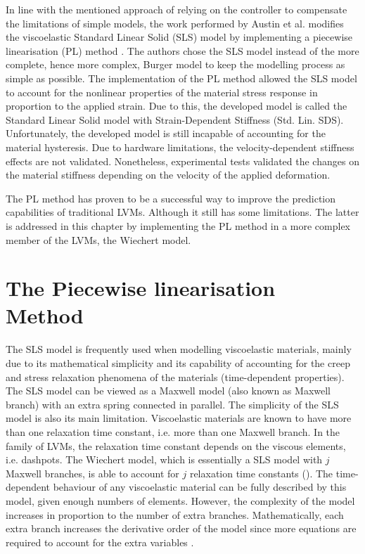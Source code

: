 In line with the mentioned approach of relying on the controller to compensate the limitations of simple models, the work performed by Austin et al. modifies the viscoelastic Standard Linear Solid (SLS) model by implementing a piecewise linearisation (PL) method \cite{austin2015control}. The authors chose the SLS model instead of the more complete, hence more complex, Burger model to keep the modelling process as simple as possible. The implementation of the PL method allowed the SLS model to account for the nonlinear properties of the material stress response in proportion to the applied strain. Due to this, the developed model is called the Standard Linear Solid model with Strain-Dependent Stiffness (Std. Lin. SDS). Unfortunately, the developed model is still incapable of accounting for the material hysteresis. Due to hardware limitations, the velocity-dependent stiffness effects are not validated. Nonetheless, experimental tests validated the changes on the material stiffness depending on the velocity of the applied deformation.

The PL method has proven to be a successful way to improve the prediction capabilities of traditional LVMs. Although it still has some limitations. The latter is addressed in this chapter by implementing the PL method in a more complex member of the LVMs, the Wiechert model.

\section{The Piecewise linearisation Method} \label{sec:wiechert}

The SLS model is frequently used when modelling viscoelastic materials, mainly due to its mathematical simplicity and its capability of accounting for the creep and stress relaxation phenomena of the materials (time-dependent properties). The SLS model can be viewed as a Maxwell model (also known as Maxwell branch) with an extra spring connected in parallel. The simplicity of the SLS model is also its main limitation. 
Viscoelastic materials are known to have more than one relaxation time constant, i.e. more than one Maxwell branch. In the family of LVMs, the relaxation time constant depends on the viscous elements, i.e. dashpots. The Wiechert model, which is essentially a SLS model with $j$ Maxwell branches, is able to account for $j$ relaxation time constants (). The time-dependent behaviour of any viscoelastic material can be fully described by this model, given enough numbers of elements. However, the complexity of the model increases in proportion to the number of extra branches. Mathematically, each extra branch increases the derivative order of the model since more equations are required to account for the extra variables \cite{tirella2014strain,roylance2001engineering}.

